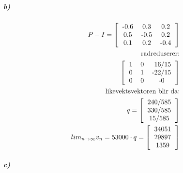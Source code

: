 \documentclass[11pt, A4paper,norsk]{article}
\begin{document}
			\subparagraph{b)}
				\begin{flushleft}

				\end{flushleft}
				\begin{align}
P - I = \left[
\begin{tabular} {ccc}
-0.6 & 0.3 & 0.2 \\
0.5 & -0.5 & 0.2 \\
0.1 & 0.2 & -0.4
\end{tabular}
\right] \\
\text{radreduserer:} \nonumber \\
\left[
\begin{tabular} {ccc}
1 & 0 & -16/15 \\
0 & 1 & -22/15 \\
0 & 0 & -0
\end{tabular}
\right] \\
\text{likevektsvektoren blir da:} \nonumber \\
q = \left[
\begin{tabular} {c}
240/585 \\
330/585 \\
15/585
\end{tabular}\right] \\
lim_{n \rightarrow \infty} v_n = 53000 \cdot q = \left[
\begin{tabular} {c}
34051 \\
29897 \\
1359
\end{tabular}\right]
				\end{align}








			\subparagraph{c)}

\end{document}
